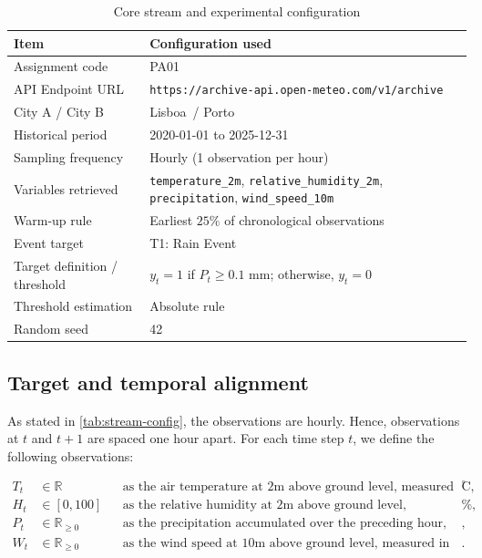 \documentclass[11pt,a4paper]{article}
\newcommand{\AssignmentCode}{PA01}
\newcommand{\CityA}{Lisboa}
\newcommand{\CityB}{Porto}
\newcommand{\EventTarget}{T1: Rain Event}
\newcommand{\TargetDefinition}{$y_t = 1$ if $P_t \ge 0.1$ mm; otherwise, $y_t = 0$}
\newcommand{\HistoricalPeriod}{2020-01-01 to 2025-12-31}
\newcommand{\WarmupRule}{Earliest $25\%$ of chronological observations}
\newcommand{\RandomSeed}{42}
\newif\ifdraftinstructions
\newcommand{\instruction}[1]{%
	\ifdraftinstructions
	\begin{instructionbox}[title=What to write here]
		\small\color{SecondaryText}#1
	\end{instructionbox}
	\fi
}
\begin{document}
	\begin{table}[H]
		\centering
		\caption{Core stream and experimental configuration}
		\label{tab:stream-config}
		\begin{tabularx}{0.94\textwidth}{@{}L{5.2cm}Y@{}}
			\toprule
			\textbf{Item} & \textbf{Configuration used} \\
			\midrule
			Assignment code & \AssignmentCode \\
			API Endpoint URL & \texttt{https://archive-api.open-meteo.com/v1/archive} \\
			City A / City B & \CityA\ / \CityB \\
			Historical period & \HistoricalPeriod \\
			Sampling frequency & Hourly (1 observation per hour) \\
			Variables retrieved & \texttt{temperature\_2m}, \texttt{relative\_humidity\_2m}, \texttt{precipitation}, \texttt{wind\_speed\_10m} \\
			Warm-up rule & \WarmupRule \\
			Event target & \EventTarget \\
			Target definition / threshold & \TargetDefinition \\
			Threshold estimation & Absolute rule \\
			Random seed & \RandomSeed \\
			\bottomrule
		\end{tabularx}
	\end{table}
	
	\subsection{Target and temporal alignment}
	\instruction{Define the binary target mathematically or in precise pseudocode. Explain which observations are used as predictors at time $t$ and why the target-defining value at time $t$ is excluded from the inputs. If a threshold is data-driven, explain that it was estimated from the pooled warm-up only and then frozen.}
	
	As stated in \autoref{tab:stream-config}, the observations are hourly. Hence, observations at $t$ and $t+1$ are spaced one hour apart. For each time step $t$, we define the following observations:
	
	\begin{align}
		T_t &\in \mathbb{R} && \text{as the air temperature at 2m above ground level, measured in } ^\circ\mathrm{C}, \\
		H_t &\in [0,100] && \text{as the relative humidity at 2m above ground level, measured in } \%, \\
		P_t &\in \mathbb{R}_{\geq 0} && \text{as the precipitation accumulated over the preceding hour, measured in mm}, \\
		W_t &\in \mathbb{R}_{\geq 0} && \text{as the wind speed at 10m above ground level, measured in km/h}.
	\end{align}
	
\end{document}

